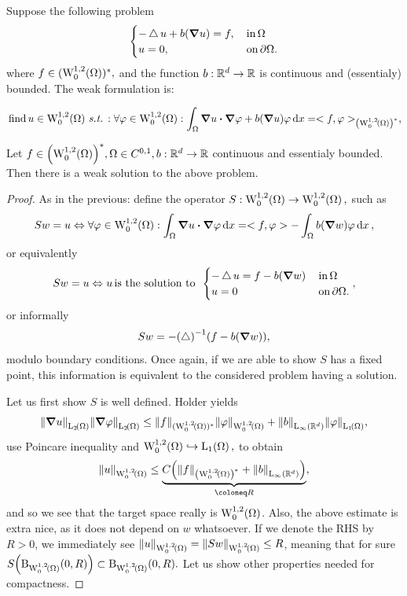 \documentclass{article}
\begin{document}
\begin{example}
	Suppose the following problem
	\[
		\begin{cases}
			- \operatorname{\bigtriangleup} u + b\qty(\grad u) = f, & \, \text{in} \, \Omega \\
			u = 0, & \, \text{on} \, \partial \Omega.
		\end{cases}
	\]
	where $f \in (\WkpzeroSet[1][2]{\Omega})^{*},$ and the function $b: {\mathbb R}^{d} \to {\mathbb R}$ is continuous and (essentialy) bounded. The weak formulation is: 

	\[
	\, \text{find} \,	u \in \WkpzeroSet[1][2]{\Omega} \, \text{\textit{s.t.}} \,: \forall \varphi \in \WkpzeroSet[1][2]{\Omega}: \int_{\Omega}\grad u \vdot \grad \varphi + b\qty(\grad u) \varphi\dd{x} = <f,\varphi>_{\qty(\WkpzeroSet[1][2]{\Omega})^{*}},
	\]

	\begin{theorem}
		Let $f \in \qty(\WkpzeroSet[1][2]{\Omega})^{*}, \Omega \in C^{0,1}, b: \R^d \to \R$ continuous and essentialy bounded. Then there is a weak solution to the above problem.
	\end{theorem}
	\begin{proof}
		As in the previous: define the operator $S: \WkpzeroSet[1][2]{\Omega} \to \WkpzeroSet[1][2]{\Omega},$  such as
		\[
			Sw = u \Leftrightarrow \forall \varphi \in \WkpzeroSet[1][2]{\Omega}: \int_{\Omega}\grad u \vdot \grad \varphi \dd{x} = <f, \varphi> - \int_{\Omega}b\qty(\grad w)\varphi \dd{x},
		\]
		or equivalently
		\[
			Sw = u \Leftrightarrow u \, \text{is the solution to } \,
			\begin{cases}
				- \operatorname{\bigtriangleup} u = f - b\qty(\grad w) & \, \text{in} \, \Omega \\
				u = 0 & \, \text{on} \, \partial \Omega.
			\end{cases}, 
		\]
		or informally
		\[
			Sw = -\qty(\operatorname{\bigtriangleup})^{-1}\qty(f - b(\grad w)),
		\]
		modulo boundary conditions. Once again, if we are able to show $S$ has a fixed point, this information is equivalent to the considered problem having a solution.

		Let us first show $S$ is well defined. Holder yields
		\[
			\norm{\grad u}_{\LpSet[2]{\Omega}}\norm{\grad \varphi}_{\LpSet[2]{\Omega}} \leq \norm{f}_{(\WkpzeroSet[1][2]{\Omega})^{*}} \norm{\varphi}_{\WkpzeroSet[1][2]{\Omega}}+ \norm{b}_{\LinfSet{\R^{d}}} \norm{\varphi}_{\LpSet[1]{\Omega}},
		\]
		use Poincare inequality and $\WkpzeroSet[1][2]{\Omega} \hookrightarrow \LpSet[1]{\Omega},$ to obtain
		\[
			\norm{u}_{\WkpzeroSet[1][2]{\Omega}} \leq \underbrace{C\qty(\norm{f}_{\qty(\WkpzeroSet[1][2]{\Omega})^{*}}+ \norm{b}_{\LinfSet{\R^{d}}})}_{\coloneq R},
		\]
		and so we see that the target space really is $\WkpzeroSet[1][2]{\Omega}$. Also, the above estimate is extra nice, as it does not depend on $w$ whatsoever. If we denote the RHS by $R>0$, we immediately see $\norm{u}_{\WkpzeroSet[1][2]{\Omega}} = \norm{Sw}_{\WkpzeroSet[1][2]{\Omega}}\leq R$, meaning that for sure $S\qty(\text{B}_{\WkpzeroSet[1][2]{\Omega}}(0,R)) \subset \text{B}_{\WkpzeroSet[1][2]{\Omega}}(0,R).$
		Let us show other properties needed for compactness.



\end{proof}
\end{example}
\end{document}
